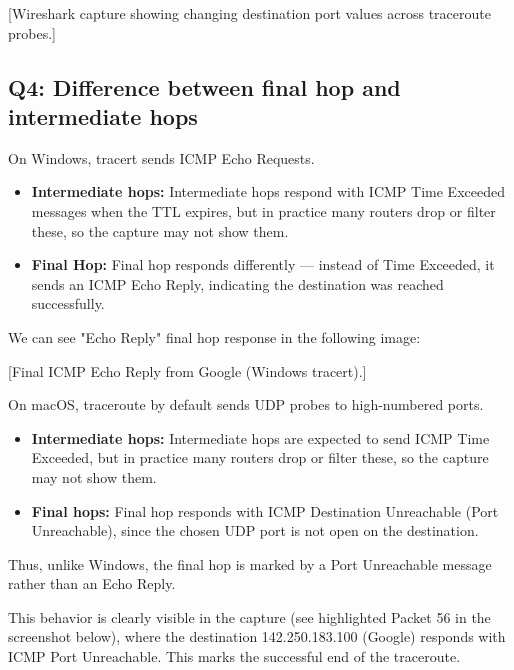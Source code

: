 \documentclass[10pt,a4paper]{report}
\begin{document}
[Wireshark capture showing changing destination port values across traceroute probes.]

\subsection*{Q4: Difference between final hop and intermediate hops}

On Windows, tracert sends ICMP Echo Requests.


\begin{itemize}
    \item \textbf{Intermediate hops:} Intermediate hops respond with ICMP Time Exceeded messages when the TTL expires, but in practice many routers drop or filter these, so the capture may not show them.

    \item \textbf{Final Hop:}
    Final hop responds differently — instead of Time Exceeded, it sends an ICMP Echo Reply, indicating the destination was reached successfully.

\end{itemize}

We can see "Echo Reply" final hop response in the following image:

[Final ICMP Echo Reply from Google (Windows tracert).]

On macOS, traceroute by default sends UDP probes to high-numbered ports.
\begin{itemize}
    \item \textbf{Intermediate hops:}
    Intermediate hops are expected to send ICMP Time Exceeded, but in practice many routers drop or filter these, so the capture may not show them.

    \item \textbf{Final hops:}
    Final hop responds with ICMP Destination Unreachable (Port Unreachable), since the chosen UDP port is not open on the destination.

\end{itemize}

Thus, unlike Windows, the final hop is marked by a Port Unreachable message rather than an Echo Reply.

This behavior is clearly visible in the capture (see highlighted Packet 56 in the screenshot below), where the destination 142.250.183.100 (Google) responds with ICMP Port Unreachable. This marks the successful end of the traceroute.
\end{document}
